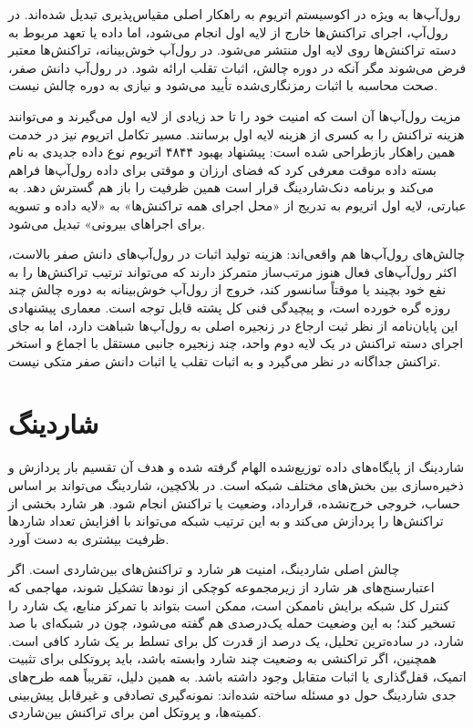 رول‌آپ‌ها به ویژه در اکوسیستم اتریوم به راهکار اصلی مقیاس‌پذیری تبدیل شده‌اند. در رول‌آپ، اجرای تراکنش‌ها خارج از لایه اول انجام می‌شود، اما داده یا تعهد مربوط به دسته تراکنش‌ها روی لایه اول منتشر می‌شود. در رول‌آپ خوش‌بینانه، تراکنش‌ها معتبر فرض می‌شوند مگر آنکه در دوره چالش، اثبات تقلب ارائه شود. در رول‌آپ دانش صفر، صحت محاسبه با اثبات رمزنگاری‌شده تأیید می‌شود و نیازی به دوره چالش نیست.

مزیت رول‌آپ‌ها آن است که امنیت خود را تا حد زیادی از لایه اول می‌گیرند و می‌توانند هزینه تراکنش را به کسری از هزینه لایه اول برسانند. مسیر تکامل اتریوم نیز در خدمت همین راهکار بازطراحی شده است: پیشنهاد بهبود ۴۸۴۴ اتریوم نوع داده جدیدی به نام بسته داده موقت معرفی کرد که فضای ارزان و موقتی برای داده رول‌آپ‌ها فراهم می‌کند و برنامه دنک‌شاردینگ قرار است همین ظرفیت را باز هم گسترش دهد. به عبارتی، لایه اول اتریوم به تدریج از «محل اجرای همه تراکنش‌ها» به «لایه داده و تسویه برای اجراهای بیرونی» تبدیل می‌شود.

چالش‌های رول‌آپ‌ها هم واقعی‌اند: هزینه تولید اثبات در رول‌آپ‌های دانش صفر بالاست، اکثر رول‌آپ‌های فعال هنوز مرتب‌ساز متمرکز دارند که می‌تواند ترتیب تراکنش‌ها را به نفع خود بچیند یا موقتاً سانسور کند، خروج از رول‌آپ خوش‌بینانه به دوره چالش چند روزه گره خورده است، و پیچیدگی فنی کل پشته قابل توجه است. معماری پیشنهادی این پایان‌نامه از نظر ثبت ارجاع در زنجیره اصلی به رول‌آپ‌ها شباهت دارد، اما به جای اجرای دسته تراکنش در یک لایه دوم واحد، چند زنجیره جانبی مستقل با اجماع و استخر تراکنش جداگانه در نظر می‌گیرد و به اثبات تقلب یا اثبات دانش صفر متکی نیست.

\section{شاردینگ}

شاردینگ از پایگاه‌های داده توزیع‌شده الهام گرفته شده و هدف آن تقسیم بار پردازش و ذخیره‌سازی بین بخش‌های مختلف شبکه است. در بلاکچین، شاردینگ می‌تواند بر اساس حساب، خروجی خرج‌نشده، قرارداد، وضعیت یا تراکنش انجام شود. هر شارد بخشی از تراکنش‌ها را پردازش می‌کند و به این ترتیب شبکه می‌تواند با افزایش تعداد شاردها ظرفیت بیشتری به دست آورد.

چالش اصلی شاردینگ، امنیت هر شارد و تراکنش‌های بین‌شاردی است. اگر اعتبارسنج‌های هر شارد از زیرمجموعه کوچکی از نودها تشکیل شوند، مهاجمی که کنترل کل شبکه برایش ناممکن است، ممکن است بتواند با تمرکز منابع، یک شارد را تسخیر کند؛ به این وضعیت حمله یک‌درصدی هم گفته می‌شود، چون در شبکه‌ای با صد شارد، در ساده‌ترین تحلیل، یک درصد از قدرت کل برای تسلط بر یک شارد کافی است. همچنین، اگر تراکنشی به وضعیت چند شارد وابسته باشد، باید پروتکلی برای تثبیت اتمیک، قفل‌گذاری یا اثبات متقابل وجود داشته باشد. به همین دلیل، تقریباً همه طرح‌های جدی شاردینگ حول دو مسئله ساخته شده‌اند: نمونه‌گیری تصادفی و غیرقابل پیش‌بینی کمیته‌ها، و پروتکل امن برای تراکنش بین‌شاردی.

